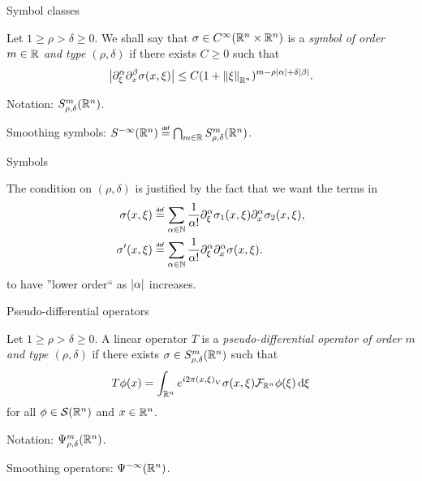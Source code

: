 \documentclass{beamer}
\begin{document}
\begin{frame}
    {Symbol classes}

    \begin{definition}

        Let $1 \geq \rho > \delta \geq 0$.
        We shall say that $\sigma \in {C^\infty(\mathbb{R}^n \times \mathbb{R}^n)}$ is a \emph{symbol of order $m \in \mathbb{R}$ and type $(\rho, \delta)$}
        if there exists $C \geq 0$ such that
        \begin{align*}
            \abs {%
                \iD {\xi^\alpha}
                \iD {x^\beta}
                \sigma(x, \xi)
            } \leq
            C (1 + \norm [\R^n] \xi)^{m - \rho \abs \alpha + \delta \abs \beta}.
        \end{align*}

        \pause
        Notation: $S^{m}_{\rho, \delta}(\mathbb{R}^n)$.
    \end{definition}

    \pause
    Smoothing symbols: $\SmoothingSymbols \defeq \bigcap_{m \in \R} \SymbolClass m {\rho, \delta}$.
\end{frame}

\begin{frame}
    {Symbols}

    The condition on $(\rho, \delta)$ is justified by the fact that we want the terms in
    \begin{align}
        \sigma(x, \xi)
        &\defeq
        \sum_{\alpha \in \N}
        \frac 1 {\alpha!}
        \iD {\xi^\alpha} \sigma_1(x, \xi)
        \iD {x^\alpha} \sigma_2(x, \xi),\\
        \sigma'(x, \xi)
        &\defeq
        \sum_{\alpha \in \N}
        \frac 1 {\alpha!}
        \iD {\xi^\alpha}
        \iD {x^\alpha} \sigma(x, \xi).
    \end{align}
    to have ''lower order`` as $\left|{\alpha}\right|$ increases.
\end{frame}

\begin{frame}
    {Pseudo-differential operators}

    \begin{definition}

        Let $1 \geq \rho > \delta \geq 0$.
        A linear operator $T$ is a \emph{pseudo-differential operator of order $m$ and type $(\rho, \delta)$}
        if there exists $\sigma \in S^{m}_{\rho, \delta}(\mathbb{R}^n)$ such that
        \begin{align*}
            T \phi(x)
            = \int_{\mathbb{R}^n} e^{i 2 \pi {\left(x, \xi\right)_{V}}} \sigma(x, \xi) \mathcal{F}_{\mathbb{R}^n} \phi(\xi) \,\mathrm{d} \xi
        \end{align*}
        for all $\phi \in {\mathcal{S} (\mathbb{R}^n)}$ and $x \in \mathbb{R}^n$.

        \pause
        Notation: $\Psi^{m}_{\rho, \delta}(\mathbb{R}^n)$.
    \end{definition}
    \pause
    Smoothing operators: ${\Psi^{-\infty} (\mathbb{R}^n)}$.
\end{frame}
\end{document}
